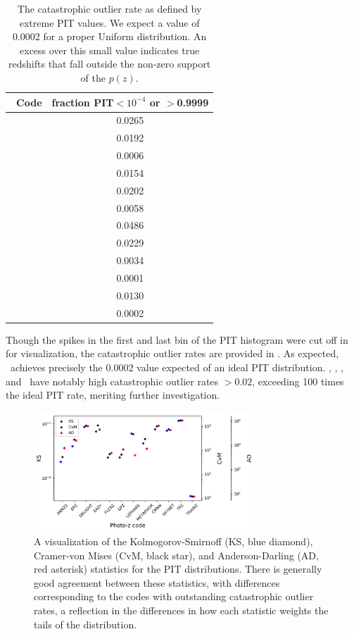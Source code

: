 \begin{table}
	\setlength{\tabcolsep}{2pt}
	\centering
	\caption{The catastrophic outlier rate as defined by extreme PIT values.
		We expect a value of 0.0002 for a proper Uniform distribution.
		An excess over this small value indicates true redshifts that fall outside the non-zero support of the $p(z)$.}
	\begin{tabular}{lc}
		\hline
		\hline
		\Pz\ Code & fraction PIT$<10^{-4}$ or $>$0.9999\\
		\hline
		\annz       & 0.0265\\
		\bpz        & 0.0192\\
		\delight    & 0.0006\\
		\eazy       & 0.0154\\
		\flexzboost & 0.0202\\
		\gpz        & 0.0058\\
		\lephare    & 0.0486\\
		\metaphor   & 0.0229\\
		\cmnn       & 0.0034\\
		\skynet     & 0.0001\\
		\tpz        & 0.0130\\
		\hline
		\trainz     & 0.0002\\
	\end{tabular}
\end{table}

Though the spikes in the first and last bin of the PIT histogram were cut off in  for visualization, the catastrophic outlier rates are provided in .
As expected, \trainz\ achieves precisely the 0.0002 value expected of an ideal PIT distribution.
\annz, \flexzboost, \lephare, and \metaphor\ have notably high catastrophic outlier rates $> 0.02$, exceeding 100 times the ideal PIT rate, meriting further investigation.

\begin{figure}
	\centering
	\includegraphics[width=0.74\textwidth]{figures/pzdc1/KSvsCvMvsAD_PIT_withnull_jpg.jpg}
	\caption{A visualization of the Kolmogorov-Smirnoff (KS, blue diamond), Cramer-von Mises (CvM, black star), and Anderson-Darling (AD, red asterisk) statistics for the PIT distributions.
		There is generally good agreement between these statistics, with differences corresponding to the codes with outstanding catastrophic outlier rates, a reflection in the differences in how each statistic weights the tails of the distribution.}
\end{figure}

